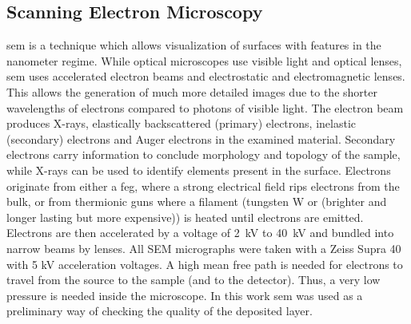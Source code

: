 \subsection{Scanning Electron Microscopy}
%
%
\Gls{sem} is a technique which allows visualization of surfaces with features in the nanometer regime. 
While optical microscopes use visible light and optical lenses, \gls{sem} uses accelerated electron beams and electrostatic and electromagnetic lenses.
This allows the generation of much more detailed images due to the shorter wavelengths of electrons compared to photons of visible light\cite{Kaliva2020}.
The electron beam produces X-rays, elastically backscattered (primary) electrons, inelastic (secondary) electrons and Auger electrons in the examined material. 
Secondary electrons carry information to conclude morphology and topology of the sample, while X-rays can be used to identify elements present in the surface. 
Electrons originate from either a \gls{feg}, where a strong electrical field rips electrons from the bulk, or from thermionic guns where a filament (tungsten W or  (brighter and longer lasting but more expensive)) is heated until electrons are emitted. 
Electrons are then accelerated by a voltage of \SI{2}{\kilo\volt} to \SI{40}{\kilo\volt} and bundled into narrow beams by lenses\cite{Vernon2000}.
All SEM micrographs were taken with a Zeiss Supra 40 with 5 kV acceleration voltages.
A high mean free path is needed for electrons to travel from the source to the sample (and to the detector). 
Thus, a very low pressure is needed inside the microscope. 
In this work \gls{sem} was used as a preliminary way of checking the quality of the deposited layer. 
\enlargethispage{\baselineskip}


\iffalse
